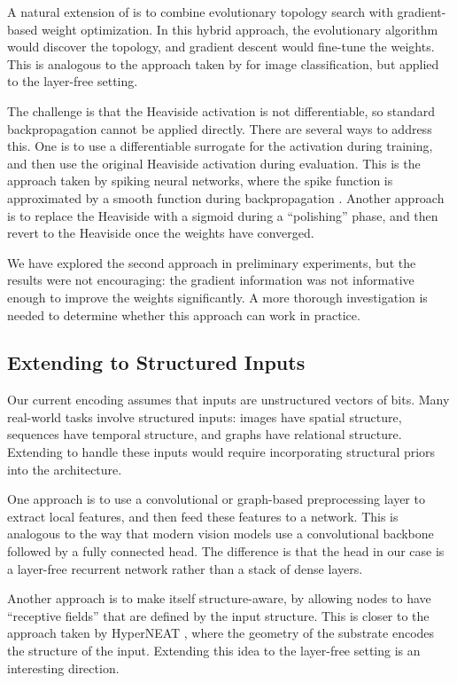 A natural extension of \modnet{} is to combine evolutionary topology
search with gradient-based weight optimization. In this hybrid
approach, the evolutionary algorithm would discover the topology, and
gradient descent would fine-tune the weights. This is analogous to
the approach taken by \citet{real2019regularized} for image
classification, but applied to the layer-free setting.

The challenge is that the Heaviside activation is not differentiable,
so standard backpropagation cannot be applied directly. There are
several ways to address this. One is to use a differentiable
surrogate for the activation during training, and then use the
original Heaviside activation during evaluation. This is the approach
taken by spiking neural networks, where the spike function is
approximated by a smooth function during backpropagation
\citep{neftci2019surrogate}. Another approach is to replace the
Heaviside with a sigmoid during a ``polishing'' phase, and then
revert to the Heaviside once the weights have converged.

We have explored the second approach in preliminary experiments, but
the results were not encouraging: the gradient information was not
informative enough to improve the weights significantly. A more
thorough investigation is needed to determine whether this approach
can work in practice.

\subsection{Extending to Structured Inputs}
\label{sec:future-structured}

Our current encoding assumes that inputs are unstructured vectors of
bits. Many real-world tasks involve structured inputs: images have
spatial structure, sequences have temporal structure, and graphs have
relational structure. Extending \modnet{} to handle these inputs
would require incorporating structural priors into the architecture.

One approach is to use a convolutional or graph-based preprocessing
layer to extract local features, and then feed these features to a
\modnet{} network. This is analogous to the way that modern vision
models use a convolutional backbone followed by a fully connected
head. The difference is that the head in our case is a layer-free
recurrent network rather than a stack of dense layers.

Another approach is to make \modnet{} itself structure-aware, by
allowing nodes to have ``receptive fields'' that are defined by the
input structure. This is closer to the approach taken by HyperNEAT
\citep{stanley2009hypercube}, where the geometry of the substrate
encodes the structure of the input. Extending this idea to the
layer-free setting is an interesting direction.

